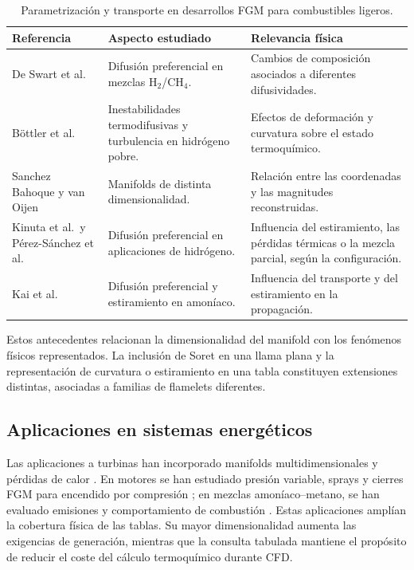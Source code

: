 \documentclass[12pt,a4paper,twoside,openany]{book}
\begin{document}
\begin{table}[htbp]
\centering
\small
\caption{Parametrización y transporte en desarrollos FGM para combustibles ligeros.}
\label{tab:fgm-literature-extensions}
\begin{tabularx}{\textwidth}{@{}p{}YY@{}}
\toprule
\textbf{Referencia} & \textbf{Aspecto estudiado} &
\textbf{Relevancia física} \\
\midrule
De Swart et al.\ \cite{deSwart2010} &
Difusión preferencial en mezclas H$_2$/CH$_4$. &
Cambios de composición asociados a diferentes difusividades. \\
Böttler et al.\ \cite{Bottler2024} &
Inestabilidades termodifusivas y turbulencia en hidrógeno pobre. &
Efectos de deformación y curvatura sobre el estado termoquímico. \\
Sanchez Bahoque y van Oijen \cite{SanchezBahoque2024} &
Manifolds de distinta dimensionalidad. &
Relación entre las coordenadas y las magnitudes reconstruidas. \\
Kinuta et al.\ y Pérez-Sánchez et al.\ \cite{Kinuta2024,PerezSanchez2025} &
Difusión preferencial en aplicaciones de hidrógeno. &
Influencia del estiramiento, las pérdidas térmicas o la mezcla parcial,
según la configuración. \\
Kai et al.\ \cite{KaiAyukawa2024} &
Difusión preferencial y estiramiento en amoníaco. &
Influencia del transporte y del estiramiento en la propagación. \\
\bottomrule
\end{tabularx}
\end{table}

Estos antecedentes relacionan la dimensionalidad del manifold con los
fenómenos físicos representados. La inclusión de Soret en una llama plana y
la representación de curvatura o estiramiento en una tabla constituyen
extensiones distintas, asociadas a familias de flamelets diferentes.

\subsection{Aplicaciones en sistemas energéticos}
\label{sec:fgm-applications}

Las aplicaciones a turbinas han incorporado manifolds multidimensionales y
pérdidas de calor \cite{DoniniThesis2014,ProchKempf2015}. En motores se han
estudiado presión variable, sprays y cierres FGM para encendido por compresión
\cite{Bekdemir2011,Wehrfritz2016,Maghbouli2019}; en mezclas amoníaco--metano,
se han evaluado emisiones y comportamiento de combustión
\cite{Honzawa2019,Fuzesi2023}. Estas aplicaciones amplían la cobertura física
de las tablas. Su mayor dimensionalidad aumenta las exigencias de generación,
mientras que la consulta tabulada mantiene el propósito de reducir el coste
del cálculo termoquímico durante CFD.
\end{document}
